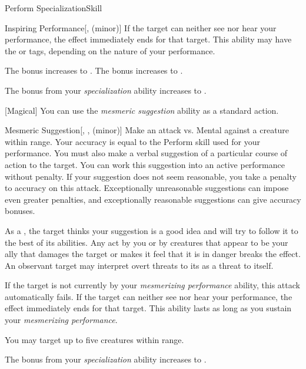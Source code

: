 \begin{feat}{Perform Specialization}{Skill}
\begin{freeability}{Inspiring Performance}[,  (minor)]
            If the target can neither see nor hear your performance, the effect immediately ends for that target.
            This ability may have the  or  tags, depending on the nature of your performance.

            \rankline
             The bonus increases to .
             The bonus increases to .
        \end{freeability}

         The bonus from your \textit{specialization} ability increases to .

        [Magical] You can use the \textit{mesmeric suggestion} ability as a standard action.
        \begin{freeability}{Mesmeric Suggestion}[, ,  (minor)]
            Make an attack vs. Mental against a creature within \rngmed range.
            Your accuracy is equal to the Perform skill used for your performance.
            You must also make a verbal suggestion of a particular course of action to the target.
            You can work this suggestion into an active performance without penalty.
            If your suggestion does not seem reasonable, you take a  penalty to accuracy on this attack.
            Exceptionally unreasonable suggestions can impose even greater penalties, and exceptionally reasonable suggestions can give accuracy bonuses.

            \hit As a , the target thinks your suggestion is a good idea and will try to follow it to the best of its abilities.
            Any act by you or by creatures that appear to be your ally that damages the target or makes it feel that it is in danger breaks the effect.
            An observant target may interpret overt threats to its  as a threat to itself.

            If the target is not currently \fascinated by your \textit{mesmerizing performance} ability, this attack automatically fails.
            If the target can neither see nor hear your performance, the effect immediately ends for that target.
            This ability lasts as long as you sustain your \textit{mesmerizing performance}.

            \rankline
             You may target up to five creatures within range.
        \end{freeability}

         The bonus from your \textit{specialization} ability increases to .

    \end{feat}


